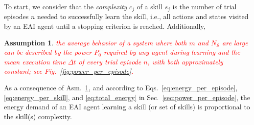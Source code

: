 \documentclass[12pt]{article}
\newcommand\myhl[1]{\textcolor{red}{#1}}
\renewcommand{\emph}[1]{\textit{#1}}
\newtheorem{assumption}{Assumption}
\begin{document}
To start, we consider that the \emph{complexity} $c_j$ of a skill $ s_j $ is the number of trial episodes $n$ needed to successfully learn the skill, i.e., all actions and states visited by an EAI agent until a stopping criterion is reached. Additionally, %
\begin{tcolorbox}
	\begin{assumption}\label{assumption:power_and_episode_time}
		\myhl{the average behavior of a system where both $m$ and $N_\mathcal{S}$ are large can be described by the power $P_0$ required by any agent during learning and the mean execution time $\Delta t$ of every trial episode $n$, with both approximately constant; see Fig.~\ref{fig:power_per_episode}.}
	\end{assumption}
\end{tcolorbox}
\noindent As a consequence of Asm.~\ref{assumption:power_and_episode_time}, and according to Eqs.~\eqref{eq:energy_per_episode},\eqref{eq:energy_per_skill}, and \eqref{eq:total_energy} in Sec.~\ref{sec:power_per_episode}, the energy demand of an EAI agent learning a skill (or set of skills) is proportional to the skill(s) complexity.

\end{document}
